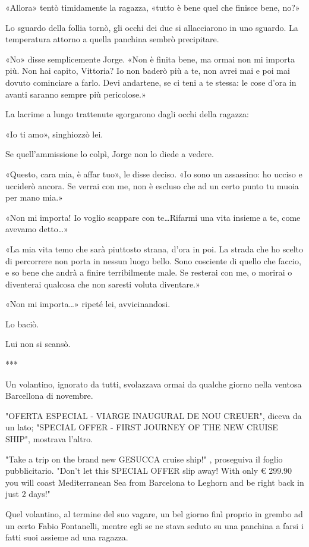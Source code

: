 «Allora» tentò timidamente la ragazza, «tutto è bene quel che finisce bene, no?»

Lo sguardo della follia tornò, gli occhi dei due si allacciarono in uno sguardo. La temperatura attorno a quella panchina sembrò precipitare.

«No» disse semplicemente Jorge. «Non è finita bene, ma ormai non mi importa più. Non hai capito, Vittoria? Io non baderò più a te, non avrei mai e poi mai dovuto cominciare a farlo. Devi andartene, se ci teni a te stessa: le cose d'ora in avanti saranno sempre più pericolose.»

La lacrime a lungo trattenute sgorgarono dagli occhi della ragazza:

«Io ti amo», singhiozzò lei.

Se quell'ammissione lo colpì, Jorge non lo diede a vedere.

«Questo, cara mia, è affar tuo», le disse deciso. «Io sono un assassino: ho ucciso e ucciderò ancora. Se verrai con me, non è escluso che ad un certo punto tu muoia per mano mia.»

«Non mi importa! Io voglio scappare con te\ldots Rifarmi una vita insieme a te, come avevamo detto\ldots»

«La mia vita temo che sarà piuttosto strana, d'ora in poi. La strada che ho scelto di percorrere non porta in nessun luogo bello. Sono cosciente di quello che faccio, e so bene che andrà a finire terribilmente male. Se resterai con me, o morirai o diventerai qualcosa che non saresti voluta diventare.»

«Non mi importa\ldots» ripeté lei, avvicinandosi.

Lo baciò.

Lui non si scansò.

***

Un volantino, ignorato da tutti, svolazzava ormai da qualche giorno nella ventosa Barcellona di novembre.

"OFERTA ESPECIAL - VIARGE INAUGURAL DE NOU CREUER", diceva da un lato; "SPECIAL OFFER - FIRST JOURNEY OF THE NEW CRUISE SHIP", mostrava l'altro.

"Take a trip on the brand new GESUCCA cruise ship!" , proseguiva il foglio pubblicitario. "Don't let this SPECIAL OFFER slip away! With only € 299.90 you will coast Mediterranean Sea from Barcelona to Leghorn and be right back in just 2 days!"

Quel volantino, al termine del suo vagare, un bel giorno finì proprio in grembo ad un certo Fabio Fontanelli, mentre egli se ne stava seduto su una panchina a farsi i fatti suoi assieme ad una ragazza.

